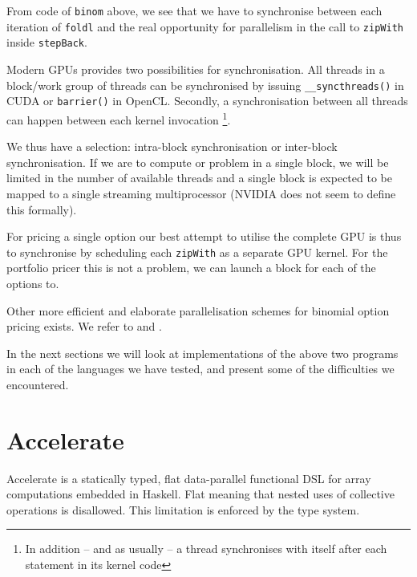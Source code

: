 \documentclass[preprint]{sigplanconf}
\begin{document}
From code of \verb|binom| above, we see that we have to synchronise
between each iteration of \verb|foldl| and the real opportunity for
parallelism in the call to \verb|zipWith| inside
\verb|stepBack|. 

Modern GPUs provides two possibilities for synchronisation. All
threads in a block/work group of threads can be synchronised by
issuing \verb|__syncthreads()| in CUDA or \verb|barrier()| in
OpenCL. Secondly, a synchronisation between all threads can happen
between each kernel invocation \footnote{In addition -- and as usually
  -- a thread synchronises with itself after each statement in its
  kernel code}.

We thus have a selection: intra-block synchronisation or inter-block
synchronisation. If we are to compute or problem in a single block, we
will be limited in the number of available threads and a single block
is expected to be mapped to a single streaming multiprocessor (NVIDIA
does not seem to define this formally).

For pricing a single option our best attempt to utilise the complete
GPU is thus to synchronise by scheduling each \verb|zipWith| as a
separate GPU kernel. For the portfolio pricer this is not a problem,
we can launch a block for each of the options to.

Other more efficient and elaborate parallelisation schemes for
binomial option pricing exists. We refer to \cite{CUDAbinomial} and
\cite{ganesan2009acceleration}.

In the next sections we will look at implementations of the above two
programs in each of the languages we have tested, and present some of
the difficulties we encountered.

\section{Accelerate}
Accelerate is a statically typed, flat data-parallel functional DSL
for array computations embedded in Haskell. Flat meaning that nested
uses of collective operations is disallowed. This limitation is
enforced by the type system.


\end{document}
